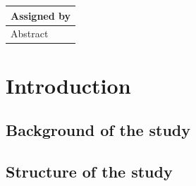 \documentclass{article}
\begin{document}
\begin{table}[]
\begin{tabular}{|l|l|l|}
\multicolumn{3}{|l|}{Assigned by}                                                                                                                                                                                                                                    \\ \hline
\multicolumn{3}{|l|}{\multirow{5}{*}{Abstract}}                                                                                                                                                                                                                      \\
\multicolumn{3}{|l|}{}                                                                                                                                                                                                                                               \\
\multicolumn{3}{|l|}{}                                                                                                                                                                                                                                               \\
\multicolumn{3}{|l|}{}                                                                                                                                                                                                                                               \\
\multicolumn{3}{|l|}{}                                                                                                                                                                                                                                               \\ \hline
\end{tabular}
\end{table}
\clearpage

\doublespacing
\tableofcontents
\pagebreak 
\setcounter{page}{1}
\rhead{\thepage}
\section{Introduction}
\subsection{Background of the study}
\subsection{Structure of the study}
\end{document}
